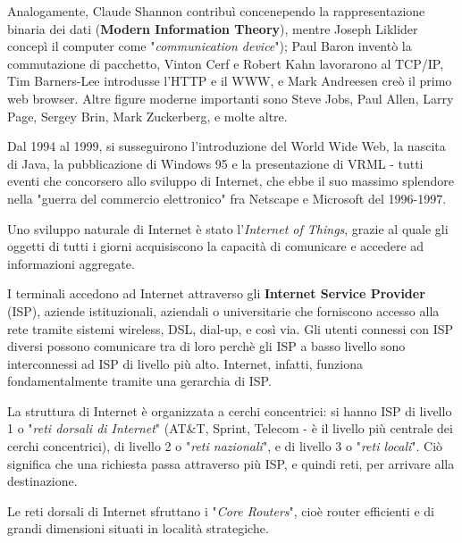         Analogamente, Claude Shannon contribuì concenependo la rappresentazione binaria dei dati (\textbf{Modern Information Theory}), mentre Joseph Liklider concepì il computer come "\textit{communication device}"); Paul Baron inventò la commutazione di pacchetto, Vinton Cerf e Robert Kahn lavorarono al TCP/IP, Tim Barners-Lee introdusse l'HTTP e il WWW, e Mark Andreesen creò il primo web browser. Altre figure moderne importanti sono Steve Jobs, Paul Allen, Larry Page, Sergey Brin, Mark Zuckerberg, e molte altre.
        
        Dal 1994 al 1999, si susseguirono l'introduzione del World Wide Web, la nascita di Java, la pubblicazione di Windows 95 e la presentazione di VRML - tutti eventi che concorsero allo sviluppo di Internet, che ebbe il suo massimo splendore nella "guerra del commercio elettronico" fra Netscape e Microsoft del 1996-1997.
        
        \vspace{3mm}
        
        Uno sviluppo naturale di Internet è stato l'\textit{Internet of Things}, grazie al quale gli oggetti di tutti i giorni acquisiscono la capacità di comunicare e accedere ad informazioni aggregate.
        
        \vspace{3mm}
        
        I terminali accedono ad Internet attraverso gli \textbf{Internet Service Provider} (ISP), aziende istituzionali, aziendali o universitarie che forniscono accesso alla rete tramite sistemi wireless, DSL, dial-up, e così via. Gli utenti connessi con ISP diversi possono comunicare tra di loro perchè gli ISP a basso livello sono interconnessi ad ISP di livello più alto. Internet, infatti, funziona fondamentalmente tramite una gerarchia di ISP.
        
        \vspace{3mm}
        
        La struttura di Internet è organizzata a cerchi concentrici: si hanno ISP di livello 1 o "\textit{reti dorsali di Internet}" (AT\&T, Sprint, Telecom - è il livello più centrale dei cerchi concentrici), di livello 2 o "\textit{reti nazionali}", e di livello 3 o "\textit{reti locali}". Ciò significa che una richiesta passa attraverso più ISP, e quindi reti, per arrivare alla destinazione.
        
        Le reti dorsali di Internet sfruttano i "\textit{Core Routers}", cioè router efficienti e di grandi dimensioni situati in località strategiche.
    
